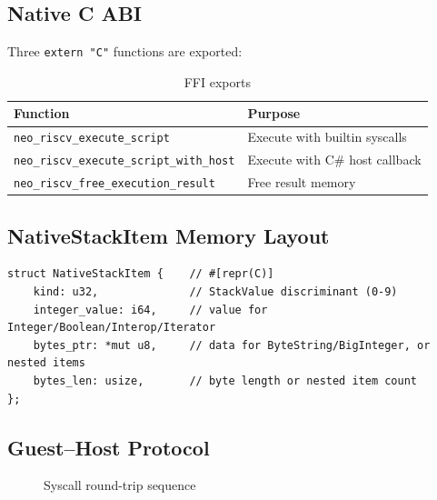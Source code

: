 \documentclass[11pt,a4paper]{article}
\begin{document}
\subsection{Native C ABI}

Three \texttt{extern "C"} functions are exported:

\begin{table}[h]
\centering\small
\begin{tabular}{@{}lp{8cm}@{}}
\toprule
\textbf{Function} & \textbf{Purpose} \\
\midrule
\texttt{neo\_riscv\_execute\_script} & Execute with builtin syscalls \\
\texttt{neo\_riscv\_execute\_script\_with\_host} & Execute with C\# host callback \\
\texttt{neo\_riscv\_free\_execution\_result} & Free result memory \\
\bottomrule
\end{tabular}
\caption{FFI exports}
\end{table}

\subsection{NativeStackItem Memory Layout}

\begin{lstlisting}
struct NativeStackItem {    // #[repr(C)]
    kind: u32,              // StackValue discriminant (0-9)
    integer_value: i64,     // value for Integer/Boolean/Interop/Iterator
    bytes_ptr: *mut u8,     // data for ByteString/BigInteger, or nested items
    bytes_len: usize,       // byte length or nested item count
};
\end{lstlisting}

\subsection{Guest--Host Protocol}

\begin{figure}[h]
\centering
{}
\caption{Syscall round-trip sequence}
\label{fig:protocol}
\end{figure}
\end{document}

